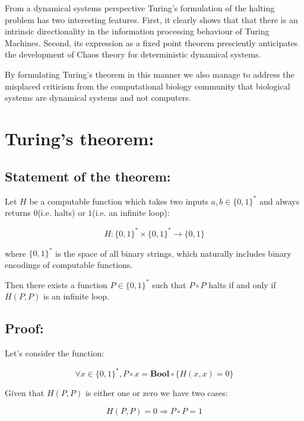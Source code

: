 \documentclass{article}
\begin{document}
From a dynamical systems perspective Turing's formulation of the halting problem has two interesting features.
First, it clearly shows that that there is an intrinsic directionality in the information processing behaviour of Turing Machines. Second, its expression as a fixed point theorem presciently anticipates the development of Chaos theory for deterministic dynamical systems.

By formulating Turing's theorem in this manner we also manage to address the misplaced criticism from the computational biology community that biological systems are dynamical systems and not computers.

\newpage


\section{Turing's theorem:}

\subsection{Statement of the theorem:}

Let $H$ be a computable function which takes two inputs $a,b \in \{0,1\}^*$ and always
returns $0$(i.e. halts) or $1$(i.e. an infinite loop):

\begin{equation}
H: \{0,1\}^* \times \{0,1\}^* \rightarrow \{0,1\}
\end{equation}

where $\{0,1\}^*$ is the space of all binary strings, which naturally includes binary encodings
of computable functions.

Then there exists a function $P \in \{0,1\}^*$ such that $P \circ P$ halts if and only if
$H(P,P)$ is an infinite loop.

\subsection{Proof:}

Let's consider the function:

\begin{equation}
\forall x \in \{0,1\}^*, P \circ x = \textbf{Bool} \circ \{H(x,x) = 0\}
\end{equation}

Given that $H(P,P)$ is either one or zero we have two cases:

\begin{equation}
H(P,P) = 0 \Rightarrow P \circ P = 1
\end{equation}
\end{document}
